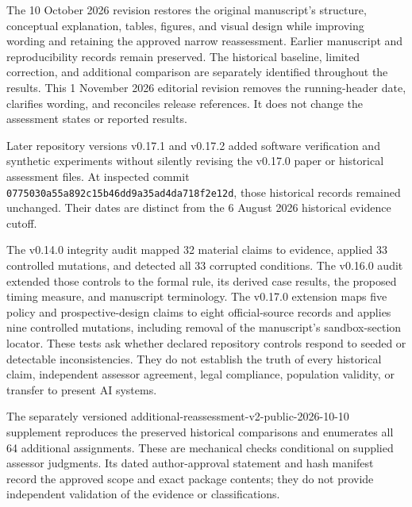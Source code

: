 \documentclass[11pt]{article}
\begin{document}
The 10 October 2026 revision restores the original manuscript’s structure, conceptual explanation, tables, figures, and visual design while improving wording and retaining the approved narrow reassessment. Earlier manuscript and reproducibility records remain preserved. The historical baseline, limited correction, and additional comparison are separately identified throughout the results. This 1 November 2026 editorial revision removes the running-header date, clarifies wording, and reconciles release references. It does not change the assessment states or reported results.

Later repository versions v0.17.1 and v0.17.2 added software verification and synthetic experiments without silently revising the v0.17.0 paper or historical assessment files. At inspected commit \texttt{0775030a\allowbreak{}55a892c1\allowbreak{}5b46dd9a\allowbreak{}35ad4da7\allowbreak{}18f2e12d}, those historical records remained unchanged. Their dates are distinct from the 6 August 2026 historical evidence cutoff.

The v0.14.0 integrity audit mapped 32 material claims to evidence, applied 33 controlled mutations, and detected all 33 corrupted conditions. The v0.16.0 audit extended those controls to the formal rule, its derived case results, the proposed timing measure, and manuscript terminology. The v0.17.0 extension maps five policy and prospective-design claims to eight official-source records and applies nine controlled mutations, including removal of the manuscript's sandbox-section locator. These tests ask whether declared repository controls respond to seeded or detectable inconsistencies. They do not establish the truth of every historical claim, independent assessor agreement, legal compliance, population validity, or transfer to present AI systems.

The separately versioned additional-reassessment-v2-public-2026-10-10 supplement reproduces the preserved historical comparisons and enumerates all 64 additional assignments. These are mechanical checks conditional on supplied assessor judgments. Its dated author-approval statement and hash manifest record the approved scope and exact package contents; they do not provide independent validation of the evidence or classifications.

\end{document}
